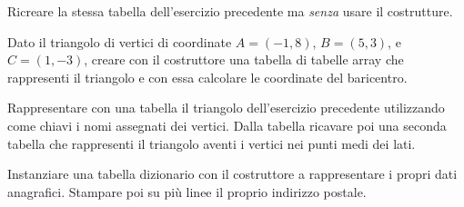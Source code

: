 \begin{Exercise}[label={tab-04}]
Ricreare la stessa tabella  dell'esercizio precedente ma \emph{senza}
usare il costrutture.
\end{Exercise}

\begin{Exercise}[label={tab-05}]
Dato il triangolo di vertici di coordinate \( A = \left( -1, 8\right) \), \( B =
\left( 5, 3\right) \), e \( C = \left( 1, -3\right) \), creare con il
costruttore una tabella di tabelle array che rappresenti il triangolo e con essa
calcolare le coordinate del baricentro.
\end{Exercise}

\begin{Exercise}[label={tab-06}]
Rappresentare con una tabella il triangolo dell'esercizio precedente utilizzando
come chiavi i nomi assegnati dei vertici. Dalla tabella ricavare poi una seconda
tabella che rappresenti il triangolo aventi i vertici nei punti medi dei lati.
\end{Exercise}

\begin{Exercise}[label={tab-07}]
Instanziare una tabella dizionario con il costruttore a rappresentare i propri
dati anagrafici. Stampare poi su più linee il proprio indirizzo postale.
\end{Exercise}

